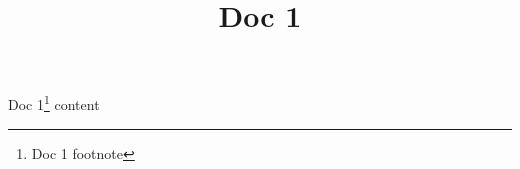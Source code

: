 \documentclass{article}
\begin{document}
\title{Doc 1}

\maketitle


Doc 1\footnote{Doc 1 footnote} content
\end{document}
